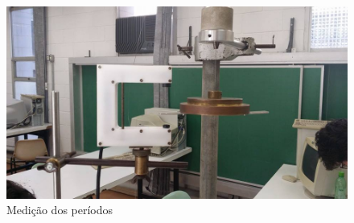 \documentclass[12pt,a4paper]{article}
\begin{document}
\begin{figure}[!htbp]
	\includegraphics[scale=0.50]{03.jpg} 
	\caption{Medição dos períodos}
\end{figure}
\end{document}
